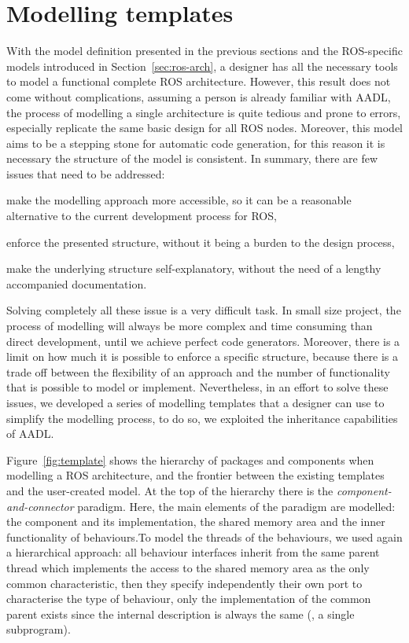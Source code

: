 \section{Modelling templates}
With the model definition presented in the previous sections and the ROS-specific models introduced in Section~\ref{sec:ros-arch}, a designer has all the necessary tools to model a functional complete ROS architecture. However, this result does not come without complications, assuming a person is already familiar with AADL, the process of modelling a single architecture is quite tedious and prone to errors, especially replicate the same basic design for all ROS nodes. Moreover, this model aims to be a stepping stone for automatic code generation, for this reason it is necessary the structure of the model is consistent. In summary, there are few issues that need to be addressed:
\begin{enumerate*}[label={\alph*)}]
\item make the modelling approach more accessible, so it can be a reasonable alternative to the current development process for ROS,
\item enforce the presented structure, without it being a burden to the design process,
\item make the underlying structure self-explanatory, without the need of a lengthy accompanied documentation.
\end{enumerate*}

Solving completely all these issue is a very difficult task. In small size project, the process of modelling will always be more complex and time consuming than direct development, until we achieve perfect code generators.  Moreover, there is a limit on how much it is possible to enforce a specific structure, because there is a trade off between the flexibility of an approach and the number of functionality that is possible to model or implement. Nevertheless, in an effort to solve these issues, we developed a series of modelling templates that a designer can use to simplify the modelling process, to do so, we exploited the inheritance capabilities of AADL.

Figure~\ref{fig:template} shows the hierarchy of packages and components when modelling a ROS architecture, and the frontier between the existing templates and the user-created model. At the top of the hierarchy there is the \textit{component-and-connector} paradigm. Here, the main elements of the paradigm are modelled: the component and its implementation, the shared memory area and the inner functionality of behaviours.To model the threads of the behaviours, we used again a hierarchical approach: all behaviour interfaces inherit from the same parent thread which implements the access to the shared memory area as the only common characteristic, then they specify independently their own port to characterise the type of behaviour, only the implementation of the common parent exists since the internal description is always the same (\ie, a single subprogram).

